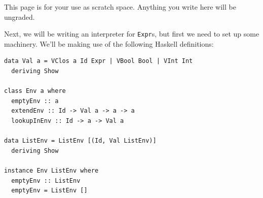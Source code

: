 \documentclass[addpoints]{exam}
\begin{document}
\begin{questions}

\newpage

This page is for your use as scratch space. Anything you write here will be ungraded.

\newpage

Next, we will be writing an interpreter for \verb|Expr|s, but first we need to set up some machinery.
We'll be making use of the following Haskell definitions:

\begin{verbatim}
data Val a = VClos a Id Expr | VBool Bool | VInt Int
  deriving Show

class Env a where
  emptyEnv :: a
  extendEnv :: Id -> Val a -> a -> a
  lookupInEnv :: Id -> a -> Val a

data ListEnv = ListEnv [(Id, Val ListEnv)]
  deriving Show

instance Env ListEnv where
  emptyEnv :: ListEnv
  emptyEnv = ListEnv []


\end{verbatim}
\end{questions}
\end{document}
